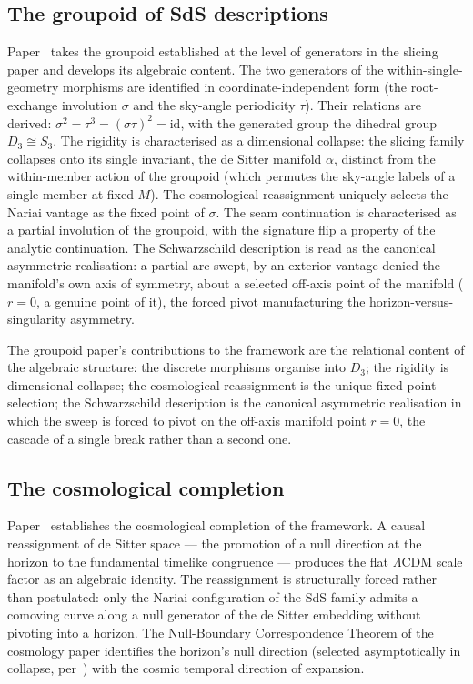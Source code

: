 \documentclass[11pt,a4paper]{article}
\theoremstyle{definition}
\begin{document}
\subsection{The groupoid of SdS descriptions}\label{sec:groupoid}

Paper~\cite{JanzenGroupoid} takes the groupoid established at the level of generators in the slicing paper and develops its algebraic content. The two generators of the within-single-geometry morphisms are identified in coordinate-independent form (the root-exchange involution $\sigma$ and the sky-angle periodicity $\tau$). Their relations are derived: $\sigma^{2}=\tau^{3}=(\sigma\tau)^{2}=\text{id}$, with the generated group the dihedral group $D_{3}\cong S_{3}$. The rigidity is characterised as a dimensional collapse: the slicing family collapses onto its single invariant, the de Sitter manifold $\alpha$, distinct from the within-member action of the groupoid (which permutes the sky-angle labels of a single member at fixed $M$). The cosmological reassignment uniquely selects the Nariai vantage as the fixed point of $\sigma$. The seam continuation is characterised as a partial involution of the groupoid, with the signature flip a property of the analytic continuation. The Schwarzschild description is read as the canonical asymmetric realisation: a partial arc swept, by an exterior vantage denied the manifold's own axis of symmetry, about a selected off-axis point of the manifold ($r=0$, a genuine point of it), the forced pivot manufacturing the horizon-versus-singularity asymmetry.

The groupoid paper's contributions to the framework are the relational content of the algebraic structure: the discrete morphisms organise into $D_{3}$; the rigidity is dimensional collapse; the cosmological reassignment is the unique fixed-point selection; the Schwarzschild description is the canonical asymmetric realisation in which the sweep is forced to pivot on the off-axis manifold point $r=0$, the cascade of a single break rather than a second one.

\subsection{The cosmological completion}\label{sec:cosmology}

Paper~\cite{JanzenCRcosmology} establishes the cosmological completion of the framework. A causal reassignment of de Sitter space --- the promotion of a null direction at the horizon to the fundamental timelike congruence --- produces the flat $\Lambda$CDM scale factor as an algebraic identity. The reassignment is structurally forced rather than postulated: only the Nariai configuration of the SdS family admits a comoving curve along a null generator of the de Sitter embedding without pivoting into a horizon. The Null-Boundary Correspondence Theorem of the cosmology paper identifies the horizon's null direction (selected asymptotically in collapse, per~\cite{JanzenBHcausality}) with the cosmic temporal direction of expansion.
\end{document}
